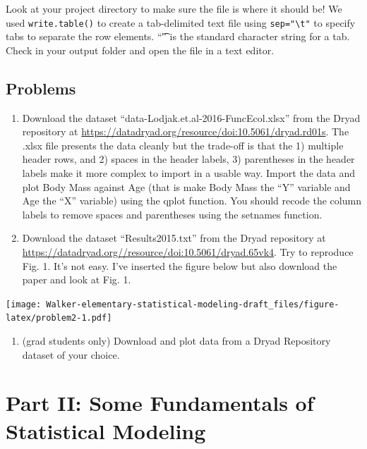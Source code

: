 \documentclass[]{book}
\providecommand{\tightlist}{%
  \setlength{\itemsep}{0pt}\setlength{\parskip}{0pt}}
\begin{document}
Look at your project directory to make sure the file is where it should
be! We used \texttt{write.table()} to create a tab-delimited text file
using \texttt{sep="\textbackslash{}t"} to specify tabs to separate the
row elements. ``\t'' is the standard character string for a tab. Check
in your output folder and open the file in a text editor.

\section{Problems}\label{problems}

\begin{enumerate}
\def\labelenumi{\arabic{enumi}.}
\item
  Download the dataset ``data-Lodjak.et.al-2016-FuncEcol.xlsx'' from the
  Dryad repository at
  \url{https://datadryad.org/resource/doi:10.5061/dryad.rd01s}. The
  .xlsx file presents the data cleanly but the trade-off is that the 1)
  multiple header rows, and 2) spaces in the header labels, 3)
  parentheses in the header labels make it more complex to import in a
  usable way. Import the data and plot Body Mass against Age (that is
  make Body Mass the ``Y'' variable and Age the ``X'' variable) using
  the qplot function. You should recode the column labels to remove
  spaces and parentheses using the setnames function.
\item
  Download the dataset ``Results2015.txt'' from the Dryad repository at
  \url{https://datadryad.org//resource/doi:10.5061/dryad.65vk4}. Try to
  reproduce Fig. 1. It's not easy. I've inserted the figure below but
  also download the paper and look at Fig. 1.
\end{enumerate}

\texttt{[image: Walker-elementary-statistical-modeling-draft\_files/figure-latex/problem2-1.pdf]}

\begin{enumerate}
\def\labelenumi{\arabic{enumi}.}
\setcounter{enumi}{2}
\tightlist
\item
  (grad students only) Download and plot data from a Dryad Repository
  dataset of your choice.
\end{enumerate}

\chapter*{Part II: Some Fundamentals of Statistical
Modeling}\label{part-ii-some-fundamentals-of-statistical-modeling}
\end{document}
